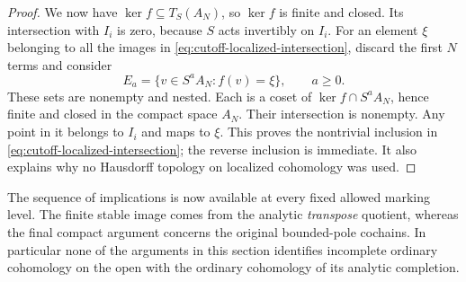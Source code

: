 \begin{proof}
We now have $\ker f\subseteq T_S(A_N)$, so $\ker f$ is finite
and closed.  Its intersection with $I_i$ is zero, because $S$
acts invertibly on $I_i$.  For an element $\xi$ belonging to all
the images in \cref{eq:cutoff-localized-intersection}, discard
the first $N$ terms and consider
\[
 E_a=\{v\in S^aA_N:f(v)=\xi\},\qquad a\geq0.
\]
These sets are nonempty and nested.  Each is a coset of
$\ker f\cap S^aA_N$, hence finite and closed in the compact
space $A_N$.  Their intersection is nonempty.  Any point in it
belongs to $I_i$ and maps to $\xi$.  This proves the nontrivial
inclusion in \cref{eq:cutoff-localized-intersection}; the reverse
inclusion is immediate.  It also explains why no Hausdorff topology
on localized cohomology was used.
\end{proof}

The sequence of implications is now available at every fixed allowed
marking level.  The finite stable image comes from the analytic
\emph{transpose} quotient, whereas the final compact argument
concerns the original bounded-pole cochains.  In particular none of
the arguments in this section identifies incomplete ordinary
cohomology on the open with the ordinary cohomology of its analytic
completion.
